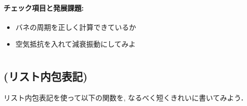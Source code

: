 \documentclass[10pt,dvipdfmx]{article}
\begin{document}
\paragraph{チェック項目と発展課題:}
\begin{itemize}
\item バネの周期を正しく計算できているか
\item 空気抵抗を入れて減衰振動にしてみよ
\end{itemize}

\newpage

\section{}
\subsection{{\scriptsize (リスト内包表記)}}
リスト内包表記を使って以下の関数を,
なるべく短くきれいに書いてみよう．
\end{document}
